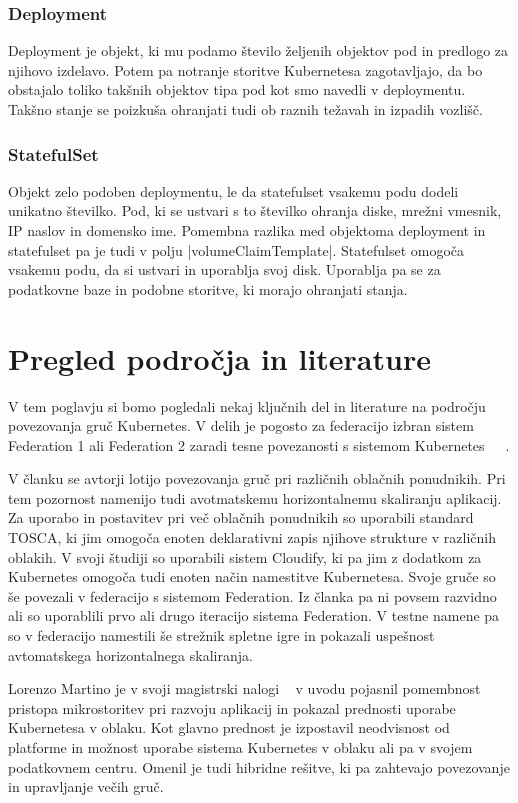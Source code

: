 \documentclass[a4paper, 12pt]{book}
\begin{document}
\subsection{Deployment~\cite{deployment}}
Deployment je objekt, ki mu podamo število željenih objektov pod in predlogo za njihovo izdelavo.
Potem pa notranje storitve Kubernetesa zagotavljajo, da bo obstajalo toliko takšnih objektov tipa pod kot smo navedli v deploymentu.
Takšno stanje se poizkuša ohranjati tudi ob raznih težavah in izpadih vozlišč.
\subsection{StatefulSet~\cite{statefulset}}
Objekt zelo podoben deploymentu, le da statefulset vsakemu podu dodeli unikatno številko. 
Pod, ki se ustvari s to številko ohranja diske, mrežni vmesnik, IP naslov in domensko ime.
Pomembna razlika med objektoma deployment in statefulset pa je tudi v polju \spverb|volumeClaimTemplate|.
Statefulset omogoča vsakemu podu, da si ustvari in uporablja svoj disk.
Uporablja pa se za podatkovne baze in podobne storitve, ki morajo ohranjati stanja.
\chapter{Pregled področja in literature}
V tem poglavju si bomo pogledali nekaj ključnih del in literature na področju povezovanja gruč Kubernetes.
V delih je pogosto za federacijo izbran sistem Federation 1 ali Federation 2 zaradi tesne povezanosti s sistemom Kubernetes~\cite{tosca-fed}~\cite{dyn-place}~\cite{kube-and-edge}.

V članku \cite{tosca-fed} se avtorji lotijo povezovanja gruč pri različnih oblačnih ponudnikih.
Pri tem pozornost namenijo tudi avotmatskemu horizontalnemu skaliranju aplikacij.
Za uporabo in postavitev pri več oblačnih ponudnikih so uporabili standard TOSCA, ki jim omogoča enoten deklarativni zapis njihove strukture v različnih oblakih.
V svoji študiji so uporabili sistem Cloudify, ki pa jim z dodatkom za Kubernetes omogoča tudi enoten način namestitve Kubernetesa.
Svoje gruče so še povezali v federacijo s sistemom Federation. 
Iz članka pa ni povsem razvidno ali so uporablili prvo ali drugo iteracijo sistema Federation.
V testne namene pa so v federacijo namestili še strežnik spletne igre in pokazali uspešnost avtomatskega horizontalnega skaliranja.

Lorenzo Martino je v svoji magistrski nalogi ~\cite{dyn-place} v uvodu pojasnil pomembnost pristopa mikrostoritev pri razvoju aplikacij in pokazal prednosti uporabe Kubernetesa v oblaku.
Kot glavno prednost je izpostavil neodvisnost od platforme in možnost uporabe sistema Kubernetes v oblaku ali pa v svojem podatkovnem centru.
Omenil je tudi hibridne rešitve, ki pa zahtevajo povezovanje in upravljanje večih gruč.
\end{document}
